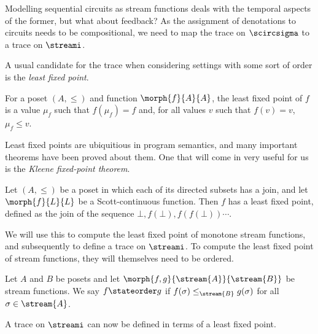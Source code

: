 Modelling sequential circuits as stream functions deals with the temporal
aspects of the former, but what about feedback?
As the assignment of denotations to circuits needs to be compositional, we need
to map the trace on \(\scircsigma\) to a trace on \(\streami\).

A usual candidate for the trace when considering settings with some sort of
order is the \emph{least fixed point}.

\begin{definition}
    For a poset \((A, \leq)\) and function \(\morph{f}{A}{A}\), the least
    fixed point of \(f\) is a value \(\mu_f\) such that \(f(\mu_f) = f\) and,
    for all values \(v\) such that \(f(v) = v\), \(\mu_f \leq v\).
\end{definition}

Least fixed points are ubiquitious in program semantics, and many important
theorems have been proved about them.
One that will come in very useful for us is the
\emph{Kleene fixed-point theorem}.

\begin{theorem}
    Let \((A, \leq)\) be a poset in which each of its directed subsets has a
    join, and let \(\morph{f}{L}{L}\) be a Scott-continuous function.
    Then \(f\) has a least fixed point, defined as the join of the sequence
    \(\bot, f(\bot), f(f(\bot)) \cdots\).
\end{theorem}

We will use this to compute the least fixed point of monotone stream functions,
and subsequently to define a trace on \(\streami\).
To compute the least fixed point of stream functions, they will themselves need
to be ordered.

\begin{definition}\label{def:state-order}
    Let \(A\) and \(B\) be posets and let
    \(\morph{f, g}{\stream{A}}{\stream{B}}\) be stream functions.
    We say \(f \stateorder g\) if \(f(\sigma) \leq_{\stream{B}} g(\sigma)\)
    for all \(\sigma \in \stream{A}\).
\end{definition}

A trace on \(\streami\) can now be defined in terms of a least fixed
point.

